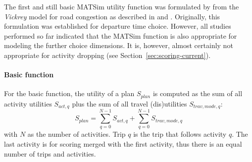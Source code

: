 The first and still basic MATSim \gls{utility} function was formulated by \citet[][]{CharyparNagel_Transportation_2005} from the \emph{Vickrey} model for road congestion as described in \citet[][]{Vickrey_TAER_1969} and \citet[][]{ArnottEtAl_TAER_1993}. Originally, this formulation was established for departure time choice. However, all studies performed so far indicated that the MATSim function is also appropriate for modeling the further choice dimensions.
%
It is, however, almost certainly not appropriate for activity dropping (see Section~\ref{sec:scoring-current}).




\paragraph{Basic function}

For the basic function, the utility of a plan $S_{plan}$ is computed as the sum of all activity utilities $S_{act,q}$ plus the sum of all travel (dis)utilities $S_{trav,mode, q}$:
%
\begin{equation}
\label{eq:matsimUTF}
S_{plan}=\sum^{N-1}_{q=0} S_{act,q} + \sum^{N-1}_{q=0} S_{trav, mode, q}
\end{equation}
with $N$ as the number of activities. Trip $q$ is the trip that follows activity $q$. The last activity is for scoring merged with the first activity, thus there is an equal number of trips and activities.

